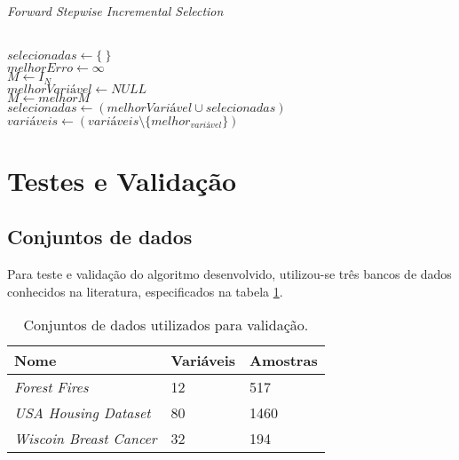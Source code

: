 \begin{algorithm}[H]
    \caption{\textit{Forward Stepwise Incremental Selection}}
    \ \\
    $selecionadas \gets \{\ \}$ \\
    $melhorErro \gets \infty$ \\
    $M \gets I_N$ \\

    { 
        $melhorVariável \gets NULL$ \\
        $M \gets melhorM $ \\
        $selecionadas \gets (melhorVariável \cup selecionadas)$ \\
        $variáveis \gets (variáveis \setminus \{melhor_{variável}\})$ \\
    }
    \label{alg:incstepwiseselection}
\end{algorithm}

\section{Testes e Validação}

\subsection{Conjuntos de dados}

Para teste e validação do algoritmo desenvolvido, utilizou-se três bancos de dados conhecidos na literatura, 
especificados na tabela \ref{tbl:datasets}.
\begin{table}[H]
    \caption{Conjuntos de dados utilizados para validação.}
    \centering
    \begin{tabular}{@{}lll@{}}
    \toprule
    Nome                           & Variáveis & Amostras \\ \midrule
    \textit{Forest Fires}          & 12        & 517      \\
    \textit{USA Housing Dataset}   & 80        & 1460     \\
    \textit{Wiscoin Breast Cancer} & 32        & 194      \\ \bottomrule
    \end{tabular}
    \label{tbl:datasets}
\end{table}

